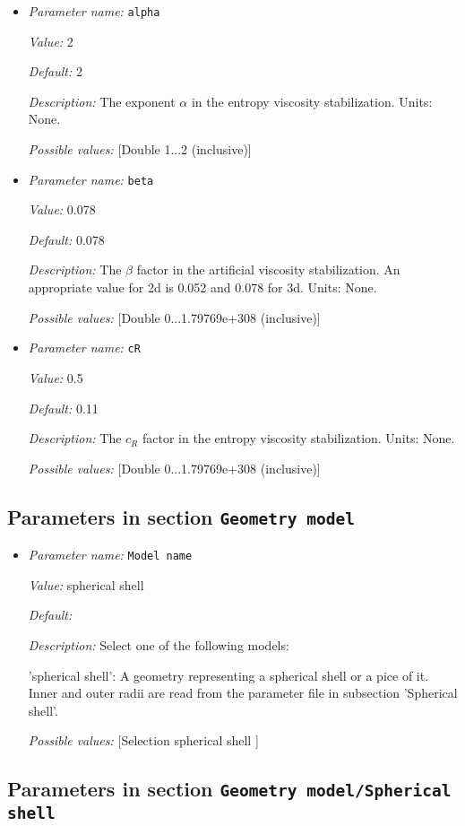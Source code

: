 \begin{itemize}
\item {\it Parameter name:} {\tt alpha}


{\it Value:} 2


{\it Default:} 2


{\it Description:} The exponent $\alpha$ in the entropy viscosity stabilization. Units: None.


{\it Possible values:} [Double 1...2 (inclusive)]
\item {\it Parameter name:} {\tt beta}


{\it Value:} 0.078


{\it Default:} 0.078


{\it Description:} The $\beta$ factor in the artificial viscosity stabilization. An appropriate value for 2d is 0.052 and 0.078 for 3d. Units: None.


{\it Possible values:} [Double 0...1.79769e+308 (inclusive)]
\item {\it Parameter name:} {\tt cR}


{\it Value:} 0.5


{\it Default:} 0.11


{\it Description:} The $c_R$ factor in the entropy viscosity stabilization. Units: None.


{\it Possible values:} [Double 0...1.79769e+308 (inclusive)]
\end{itemize}

\subsection{Parameters in section \tt Geometry model}

\begin{itemize}
\item {\it Parameter name:} {\tt Model name}


{\it Value:} spherical shell


{\it Default:} 


{\it Description:} Select one of the following models:

'spherical shell': A geometry representing a spherical shell or a pice of it. Inner and outer radii are read from the parameter file in subsection 'Spherical shell'.


{\it Possible values:} [Selection spherical shell ]
\end{itemize}



\subsection{Parameters in section \tt Geometry model/Spherical shell}

